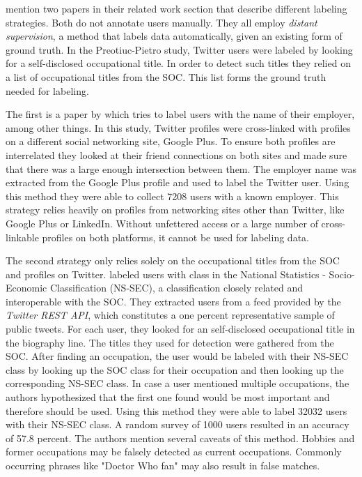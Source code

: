 \documentclass[
10pt, %
a4paper, %
oneside, %
headinclude,footinclude, %
] {book}%
\begin{document}
\citet{pietro} mention two papers in their related work section that describe different labeling strategies. Both do not annotate users manually. They all employ \textit{distant supervision}, a method that labels data automatically, given an existing form of ground truth. In the Preotiuc-Pietro study, Twitter users were labeled by looking for a self-disclosed occupational title. In order to detect such titles they relied on a list of occupational titles from the SOC. This list forms the ground truth needed for labeling.

The first is a paper by \citet{li} which tries to label users with the name of their employer, among other things. In this study, Twitter profiles were cross-linked with profiles on a different social networking site, Google Plus. To ensure both profiles are interrelated they looked at their friend connections on both sites and made sure that there was a large enough intersection between them. The employer name was extracted from the Google Plus profile and used to label the Twitter user. Using this method they were able to collect 7208 users with a known employer. 
This strategy relies heavily on profiles from networking sites other than Twitter, like Google Plus or LinkedIn. Without unfettered access or a large number of cross-linkable profiles on both platforms, it cannot be used for labeling data.

The second strategy only relies solely on the occupational titles from the SOC and profiles on Twitter. \citet{sloan} labeled users with class in the National Statistics - Socio-Economic Classification (NS-SEC), a classification closely related and interoperable with the SOC. 
They extracted users from a feed provided by the \textit{Twitter REST API}, which constitutes a one percent representative sample of public tweets. For each user, they looked for an self-disclosed occupational title in the biography line. The titles they used for detection were gathered from the SOC. After finding an occupation, the user would be labeled with their NS-SEC class by looking up the SOC class for their occupation and then looking up the corresponding NS-SEC class. In case a user mentioned multiple occupations, the authors hypothesized that the first one found would be most important and therefore should be used. 
Using this method they were able to label 32032 users with their NS-SEC class. A random survey of 1000 users resulted in an accuracy of 57.8 percent. The authors mention several caveats of this method. Hobbies and former occupations may be falsely detected as current occupations. Commonly occurring phrases like "Doctor Who fan" may also result in false matches.
\end{document}
